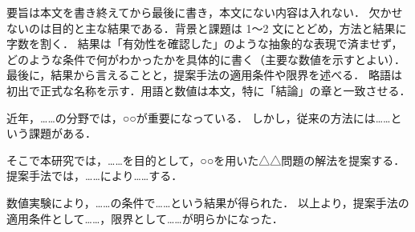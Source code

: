 \begin{abstractJA}
\begin{writingnote}
要旨は本文を書き終えてから最後に書き，本文にない内容は入れない．
欠かせないのは目的と主な結果である．背景と課題は 1〜2 文にとどめ，方法と結果に字数を割く．
結果は「有効性を確認した」のような抽象的な表現で済ませず，どのような条件で何がわかったかを具体的に書く（主要な数値を示すとよい）．
最後に，結果から言えることと，提案手法の適用条件や限界を述べる．
略語は初出で正式な名称を示す．用語と数値は本文，特に「結論」の章と一致させる．
\end{writingnote}

近年，……の分野では，○○が重要になっている．
しかし，従来の方法には……という課題がある．

そこで本研究では，……を目的として，○○を用いた△△問題の解法を提案する．
提案手法では，……により……する．

数値実験により，……の条件で……という結果が得られた．
以上より，提案手法の適用条件として……，限界として……が明らかになった．
\end{abstractJA}

